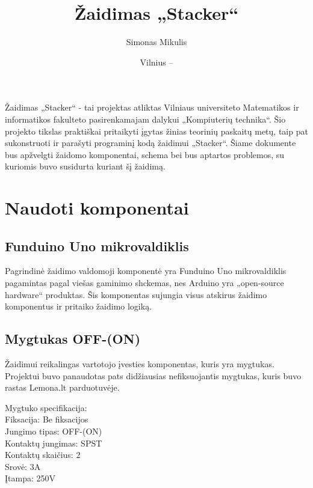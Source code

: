 \documentclass{VUMIFPSkursinis}
\title{Žaidimas „Stacker“}
\author{Simonas Mikulis}
\date{Vilnius – \the\year}
\begin{document}
	
\maketitle
\cleardoublepage{}
\setcounter{page}{2}

\tableofcontents

Žaidimas „Stacker“ - tai projektas atliktas Vilniaus universiteto Matematikos ir informatikos
fakulteto pasirenkamajam dalykui „Kompiuterių technika“. Šio projekto tikslas praktiškai
pritaikyti įgytas žinias teorinių paskaitų metų, taip pat sukonstruoti ir parašyti
programinį kodą žaidimui „Stacker“.
Šiame dokumente bus apžvelgti žaidomo komponentai, schema bei bus aptartos problemos,
su kuriomis buvo susidurta kuriant šį žaidimą.



\section{Naudoti komponentai}
  \subsection{Funduino Uno mikrovaldiklis}

    Pagrindinė žaidimo valdomoji komponentė yra Funduino Uno mikrovaldiklis pagamintas
    pagal viešas gaminimo shckemas, nes Arduino yra „open-source hardware“ produktas.
    Šis komponentas sujungia visus atskirus žaidimo komponentus ir pritaiko žaidimo logiką.

  \subsection{Mygtukas OFF-(ON)}

    Žaidimui reikalingas vartotojo įvesties komponentas, kuris yra mygtukas.
    Projektui buvo panaudotas pats didžiausias nefiksuojantis mygtukas, kuris buvo
    rastas Lemona.lt parduotuvėje.
    
    Mygtuko specifikacija: \\
      \indent\indent Fiksacija: Be fiksacijos \\
      \indent\indent Jungimo tipas: OFF-(ON) \\
      \indent\indent Kontaktų jungimas: SPST \\
      \indent\indent Kontaktų skaičius: 2 \\
      \indent\indent Srovė: 3A \\
      \indent\indent Įtampa: 250V
\end{document}
